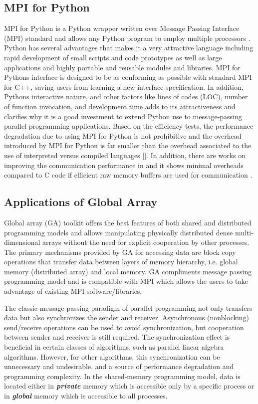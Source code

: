 \label{frameworks}

\subsection{MPI for Python}
MPI for Python is a Python wrapper written over Message Passing Interface (MPI) standard and allows any Python program to employ multiple processors \citep{Dalcin:2011aa, Dalcin:2005aa}.
Python has several advantages that makes it a very attractive language including rapid development of small scripts and code prototypes as well as large applications and highly portable and reusable modules and libraries.
MPI for Python\textquotesingle s interface is designed to be as conforming as possible with standard MPI for C++, saving users from learning a new interface specification. 
In addition, Python\textquotesingle s interactive nature, and other factors like lines of codes (LOC), number of function invocation, and development time adds to its attractiveness and clarifies why it is a good investment to extend Python use to message-passing parallel programming applications.
Based on the efficiency tests, the performance degradation due to using MPI for Python is not prohibitive and the overhead introduced by MPI for Python is far smaller than the overhead associated to the use of interpreted versus compiled languages [].
In addition, there are works on improving the communication performance in  and it shows minimal overheads compared to C code if efficient raw memory buffers are used for communication \citep{Dalcin:2011aa}.

\subsection{Applications of Global Array}
Global array (GA) toolkit offers the best features of both shared and distributed programming models and allows manipulating physically distributed dense multi-dimensional arrays without the need for explicit cooperation by other processes.
The primary mechanisms provided by GA for accessing data are block copy operations that transfer data between layers of memory hierarchy, i.e. global memory (distributed array) and local memory. 
GA compliments message passing programming model and is compatible with MPI which allows the users to take advantage of existing MPI software/libraries.

The classic message-passing paradigm of parallel programming not only transfers data but also synchronizes the sender and receiver. 
Asynchronous (nonblocking) send/receive operations can be used to avoid synchronization, but cooperation between sender and receiver is still required. 
The synchronization effect is beneficial in certain classes of algorithms, such as parallel linear algebra algorithms.
However, for other algorithms, this synchronization can be unnecessary and undesirable, and a source of performance degradation and programming complexity. 
In the shared-memory programming model, data is located either in \textbf{\textit{private}} memory which is accessible only by a specific process or in \textbf{\textit{global}} memory which is accessible to all processes. 


